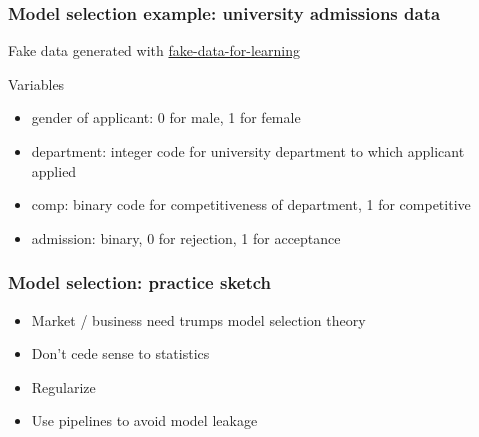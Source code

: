 \begin{frame}
\frametitle{Model selection example: university admissions data}
Fake data generated with \href{https://munichpavel.github.io/fake-data-for-learning/}{fake-data-for-learning}\newline

 \newline

 Variables
\begin{itemize}
\item gender of applicant: 0 for male, 1 for female
\item department: integer code for university department to which applicant applied
\item comp: binary code for competitiveness of department, 1 for competitive
\item admission: binary, 0 for rejection, 1 for acceptance
\end{itemize}
\end{frame}


\begin{frame}
  \frametitle{Model selection: practice sketch}

  \begin{itemize}
    \item Market / business need trumps model selection theory
    \item Don't cede sense to statistics
    \item Regularize
    \item Use pipelines to avoid model leakage
  \end{itemize}
\end{frame}

